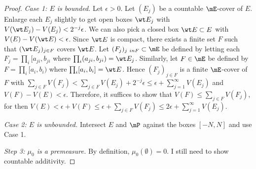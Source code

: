 \documentclass{article}
\begin{document}
\begin{proof}
\emph{Case 1: $E$ is bounded.} Let $\epsilon > 0$.  Let $(E_j)$ be a countable $\mE$-cover of $E$.  Enlarge each $E_j$ slightly to get open boxes $\wt E_j$ with $V(\wt E_j) - V(E_j) < 2^{-j} \epsilon$.  We can also pick a closed box $\wt E \subset E$ with $V(E) - V(\wt E) < \epsilon$. Since $\wt E$ is compact, there exists a finite set $F$ such that $(\wt E_j)_{j \in F}$ covers $\wt E$.  Let $(F_j)_{j\ in F} \subset \mE$ be defined by letting each $F_j = \prod_i [a_{ji}, b_{ji}$ where $\prod_i (a_{ji}, b_{ji}) = \wt E_j$.  Similarly, let $F \in \mE$ be defined by $F = \prod_i [a_i, b_i)$ where $\prod_i [a_i, b_i] = \wt E$.  Hence $(F_j)_{j \in F}$ is a finite $\mE$-cover of $F$ with $\sum_{j\in F} V(F_j) < \sum_{j\in F} V(E_j) + 2^{-j} \epsilon \le \epsilon + \sum_{j=1}^\infty V(E_j)$ and $V(F) - V(E) < \epsilon$.  Therefore, it suffices to show that $V(F) \le \sum_{j \in F} V(F_j)$, for then $V(E) < \epsilon + V(F) \le \epsilon + \sum_{j \in F} V(F_j)  \le 2 \epsilon + \sum_{j=1}^\infty V(E_j)$.

\emph{Case 2: $E$ is unbounded.}  Intersect $E$ and $\mP$ against the boxes $[-N, N]$ and use Case 1.

\emph{Step 3: $\mu_0$ is a premeasure.} By definition, $\mu_0(\emptyset) = 0$.  I still need to show countable additivity.

\end{proof}
\end{document}
